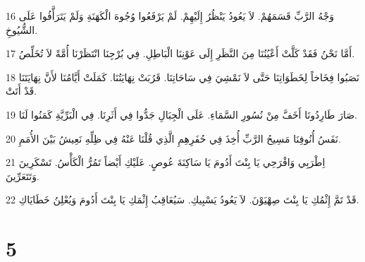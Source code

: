 \par 16 وَجْهُ الرَّبِّ قَسَمَهُمْ. لاَ يَعُودُ يَنْظُرُ إِلَيْهِمْ. لَمْ يَرْفَعُوا وُجُوهَ الْكَهَنَةِ وَلَمْ يَتَرَأَّفُوا عَلَى الشُّيُوخِ.
\par 17 أَمَّا نَحْنُ فَقَدْ كَلَّتْ أَعْيُنُنَا مِنَ النَّظَرِ إِلَى عَوْنِنَا الْبَاطِلِ. فِي بُرْجِنَا انْتَظَرْنَا أُمَّةً لاَ تُخَلِّصُ.
\par 18 نَصَبُوا فِخَاخاً لِخَطَوَاتِنَا حَتَّى لاَ نَمْشِيَ فِي سَاحَاتِنَا. قَرُبَتْ نِهَايَتُنَا. كَمَلَتْ أَيَّامُنَا لأَنَّ نِهَايَتَنَا قَدْ أَتَتْ.
\par 19 صَارَ طَارِدُونَا أَخَفَّ مِنْ نُسُورِ السَّمَاءِ. عَلَى الْجِبَالِ جَدُّوا فِي أَثَرِنَا. فِي الْبَرِّيَّةِ كَمَنُوا لَنَا.
\par 20 نَفَسُ أُنُوفِنَا مَسِيحُ الرَّبِّ أُخِذَ فِي حُفَرِهِمِ الَّذِي قُلْنَا عَنْهُ فِي ظِلِّهِ نَعِيشُ بَيْنَ الأُمَمِ.
\par 21 اِطْرَبِي وَافْرَحِي يَا بِنْتَ أَدُومَ يَا سَاكِنَةَ عُوصٍ. عَلَيْكِ أَيْضاً تَمُرُّ الْكَأْسُ. تَسْكَرِينَ وَتَتَعَرِّينَ.
\par 22 قَدْ تَمَّ إِثْمُكِ يَا بِنْتَ صِهْيَوْنَ. لاَ يَعُودُ يَسْبِيكِ. سَيُعَاقِبُ إِثْمَكِ يَا بِنْتَ أَدُومَ وَيُعْلِنُ خَطَايَاكِ.

\chapter{5}

